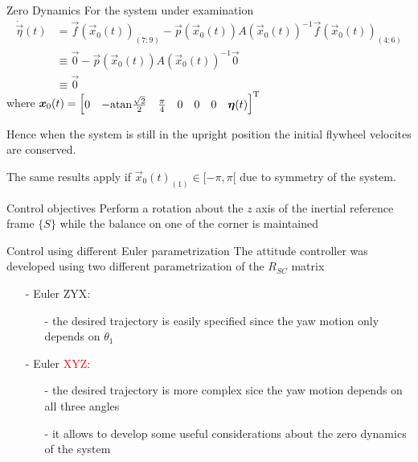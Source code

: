 \begin{frame}{Zero Dynamics \cubli}
  For the system under examination
  \[
  \begin{split}
    \dot{\vec{\eta}}(t) &= \vec{f}(\vec{x}_{0}(t))_{(7:9)} - \vec{p}
    (\vec{x}_{0}(t))A(\vec{x}_{0}(t))^{-1}  \vec{f}(\vec{x}_{0}(t))_{(4:6)}\\
    &\equiv \vec{0} - \vec{p}
    (\vec{x}_{0}(t))A(\vec{x}_{0}(t))^{-1}  \vec{0}\\
    &\equiv \vec{0}
  \end{split}
  \]
  where $\boldsymbol{x}_{0}(t)=
  \begin{bmatrix}
    0 & -\mathrm{atan}\frac{\sqrt{2}}{2} & \frac{\pi}{4} & 0 & 0 & 0 &
    \boldsymbol{\eta}(t)
  \end{bmatrix}^{\mathrm{T}}
  $
  \par
  Hence when the system is still in the upright position the initial flywheel velocites
  are conserved.
  \par
  The same results apply if $\vec{x}_{0}(t)_{(1)} \in [-\pi, \pi[$ due to symmetry of the system.
\end{frame}

\begin{frame}{Control objectives}
  Perform a rotation about the $z$ axis of the inertial
  reference frame $\{S\}$ while the balance on one of the corner is maintained
  \begin{center}
  \end{center}
\end{frame}

\begin{frame}{Control using different Euler parametrization}
  The attitude controller was developed using two different parametrization of the $R_{SC}$ matrix
  \begin{itemize}
  \item[-] Euler \textcolor{dgreen}{ZYX}:   
    \begin{itemize}
    \item[-] the desired trajectory is easily specified since the yaw motion \alert{only} depends on $\theta_1$
    \end{itemize}
  \item[-] Euler \textcolor{red}{XYZ}:
    \begin{itemize}
    \item[-] the desired trajectory is more complex sice the yaw motion depends on  \alert{all} three angles
    \item[-] it allows to develop some useful considerations about the zero dynamics of the system
    \end{itemize}
  \end{itemize}
\end{frame}

